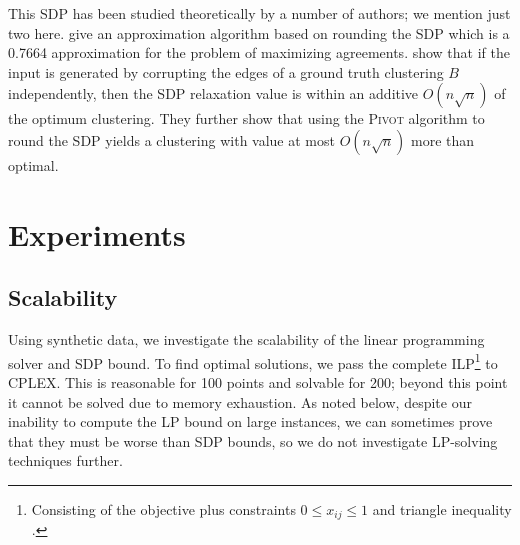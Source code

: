 \documentclass[11pt]{article}
\newcommand{\commentw}[1]{{\bf WS: #1}}
\newcommand{\alg}[1]{\textsc{#1}}
\begin{document}
This SDP has been studied theoretically by a number of authors; we
mention just two here.  give an approximation
algorithm based on rounding the SDP which is a 0.7664 approximation
for the problem of maximizing agreements.  show
that if the input is generated by corrupting the edges of a ground
truth clustering $B$ independently, then the SDP relaxation value is
within an additive $O(n \sqrt n)$ of the optimum clustering. They
further show that using the \alg{Pivot} algorithm to round the SDP yields a
clustering with value at most $O(n \sqrt n)$ more than optimal.

\section{Experiments}

\subsection{Scalability}
\label{synthetic}




Using synthetic data, we investigate the scalability of the linear
programming solver and SDP bound. To find optimal solutions, we pass
the complete ILP\footnote{Consisting of the objective plus constraints
  $0 \le x_{ij} \le 1$ and triangle inequality \cite{Ailon08}.} to
CPLEX. This is reasonable for 100 points and solvable for 200; beyond
this point it cannot be solved due to memory exhaustion. As noted
below, despite our inability to compute the LP bound on large
instances, we can sometimes prove that they must be worse than SDP
bounds, so we do not investigate LP-solving techniques further.

\end{document}
